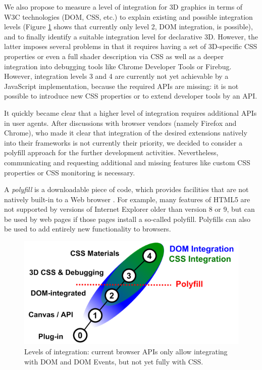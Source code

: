 \documentclass{acmsiggraph}
\begin{document}
We also propose to measure a level of integration for 3D graphics in terms of W3C technologies (DOM, CSS, etc.) to explain existing and possible integration levels (Figure \ref{fig:polyInt} shows that currently only level 2, DOM integration, is possible), and to finally identify a suitable integration level for declarative 3D. However, the latter imposes several problems in that it requires having a set of 3D-specific CSS properties or even a full shader description via CSS as well as a deeper integration into debugging tools like Chrome Developer Tools or Firebug. However, integration levels 3 and 4 are currently not yet achievable by a JavaScript implementation, because the required APIs are missing: it is not possible to introduce new CSS properties or to extend developer tools by an API.

It quickly became clear that a higher level of integration requires additional APIs in user agents. After discussions with browser vendors (namely Firefox and Chrome), who made it clear that integration of the desired extensions natively into their frameworks is not currently their priority, we decided to consider a polyfill approach for the further development activities.
Nevertheless, communicating and requesting additional and missing features like custom CSS properties or CSS monitoring is necessary.

A \textit{polyfill} is a downloadable piece of code, which provides facilities that are not natively built-in to a Web browser \cite{Sharp2010}. For example, many features of HTML5 are not supported by versions of Internet Explorer older than version 8 or 9, but can be used by web pages if those pages install a so-called polyfill. Polyfills can also be used to add entirely new functionality to browsers.

\begin{figure}
  \centering
  \includegraphics[width=0.85\columnwidth]{images/polyfill.png}
  \caption{Levels of integration: current browser APIs only allow integrating with DOM and DOM Events, but not yet fully with CSS.}
  \label{fig:polyInt}
  \vspace{-0.2cm}
\end{figure}
\end{document}
